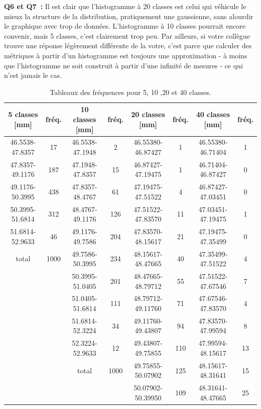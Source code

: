 \textbf{Q6 et Q7~:} Il est clair que l'histogramme à 20 classes est celui qui véhicule le mieux la structure de la distribution, pratiquement une gaussienne, sans alourdir le graphique avec trop de données. L'histogramme à 10 classes pourrait encore convenir, mais 5 classes, c'est clairement trop peu. Par ailleurs, si votre collègue trouve une réponse légèrement différente de la votre, c'est parce que calculer des métriques à partir d'un histogramme est toujours une approximation - à moins que l'histogramme ne soit construit à partir d'une infinité de mesures - ce qui n'est jamais le cas.

\begin{table}[p]
\footnotesize
\caption{Tableaux des fréquences pour 5, 10 ,20 et 40 classes.}
\begin{center}
\begin{tabular}{cccccccc}
5 classes [mm] & fréq. & 10 classes [mm] & fréq. & 20 classes [mm] & fréq. & 40 classes [mm] & fréq. \\\hline
46.5538-47.8357 &  17 & 46.5538-47.1948 &   2 & 46.55380-46.87427 &   1 & 46.55380-46.71404 &  1 \\
47.8357-49.1176 & 187 & 47.1948-47.8357 &  15 & 46.87427-47.19475 &   1 & 46.71404-46.87427 &  0 \\
49.1176-50.3995 & 438 & 47.8357-48.4767 &  61 & 47.19475-47.51522 &   4 & 46.87427-47.03451 &  0 \\
50.3995-51.6814 & 312 & 48.4767-49.1176 & 126 & 47.51522-47.83570 &  11 & 47.03451-47.19475 &  1 \\
51.6814-52.9633 &  46 & 49.1176-49.7586 & 204 & 47.83570-48.15617 &  21 & 47.19475-47.35499 &  0 \\
         total & 1000 & 49.7586-50.3995 & 234 & 48.15617-48.47665 &  40 & 47.35499-47.51522 &  4 \\
                    & & 50.3995-51.0405 & 201 & 48.47665-48.79712 &  55 & 47.51522-47.67546 &  7 \\
                    & & 51.0405-51.6814 & 111 & 48.79712-49.11760 &  71 & 47.67546-47.83570 &  4 \\
                    & & 51.6814-52.3224 &  34 & 49.11760-49.43807 &  94 & 47.83570-47.99594 &  8 \\
                    & & 52.3224-52.9633 &  12 & 49.43807-49.75855 & 110 & 47.99594-48.15617 & 13 \\
                             & & total & 1000 & 49.75855-50.07902 & 125 & 48.15617-48.31641 & 15 \\
                                        & & & & 50.07902-50.39950 & 109 & 48.31641-48.47665 & 25 \\

\end{tabular}
\end{center}
\end{table}
